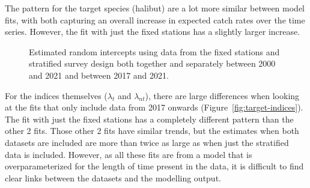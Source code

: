 \documentclass[12pt]{article}\usepackage[]{graphicx}\usepackage[]{color}
\begin{document}
The pattern for the target species (halibut) are a lot more similar between model fits, with both capturing an overall increase in expected catch rates over the time series. However, the fit with just the fixed stations has a slightly larger increase.
\begin{figure}[htb]

{\centering {}  

}

\caption{Estimated random intercepts using data from the fixed stations and stratified survey design both together and separately between 2000 and 2021 and between 2017 and 2021.}\label{fig:rand-int}
\end{figure}
For the indices themselves (\(\lambda_t\) and \(\lambda_{nt}\)), there are large differences when looking at the fits that only include data from 2017 onwards (Figure~\ref{fig:target-indices}). The fit with just the fixed stations has a completely different pattern than the other 2 fits. Those other 2 fits have similar trends, but the estimates when both datasets are included are more than twice as large as when just the stratified data is included. However, as all these fits are from a model that is overparameterized for the length of time present in the data, it is difficult to find clear links between the datasets and the modelling output.
\end{document}
